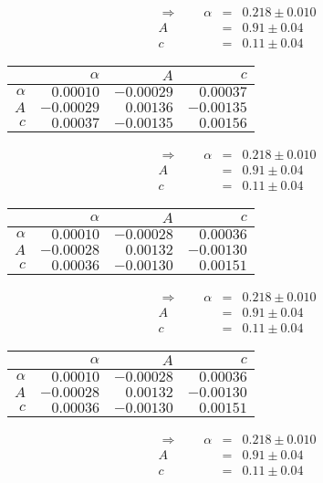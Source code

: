 \begin{align}\Rightarrow \qquad
    \alpha &=& 0.218 \pm 0.010 \\
    A &=& 0.91 \pm 0.04 \\
    c &=& 0.11 \pm 0.04 
\end{align}

 \begin{tabular}{|r|r|r|r|}
 \hline 
\cellcolor{tabcolor}&\cellcolor{tabcolor}$\alpha$&\cellcolor{tabcolor}$A$&\cellcolor{tabcolor}$c$\\ \hline 
 \cellcolor{tabcolor}$\alpha$&$0.00010$ &$-0.00029$ &$0.00037$ \\ \hline
\cellcolor{tabcolor}$A$&$-0.00029$ &$0.00136$ &$-0.00135$ \\ \hline
\cellcolor{tabcolor}$c$&$0.00037$ &$-0.00135$ &$0.00156$ \\ \hline
\end{tabular}
\begin{align}\Rightarrow \qquad
    \alpha &=& 0.218 \pm 0.010 \\
    A &=& 0.91 \pm 0.04 \\
    c &=& 0.11 \pm 0.04 
\end{align}

 \begin{tabular}{|r|r|r|r|}
 \hline 
\cellcolor{tabcolor}&\cellcolor{tabcolor}$\alpha$&\cellcolor{tabcolor}$A$&\cellcolor{tabcolor}$c$\\ \hline 
 \cellcolor{tabcolor}$\alpha$&$0.00010$ &$-0.00028$ &$0.00036$ \\ \hline
\cellcolor{tabcolor}$A$&$-0.00028$ &$0.00132$ &$-0.00130$ \\ \hline
\cellcolor{tabcolor}$c$&$0.00036$ &$-0.00130$ &$0.00151$ \\ \hline
\end{tabular}
\begin{align}\Rightarrow \qquad
    \alpha &=& 0.218 \pm 0.010 \\
    A &=& 0.91 \pm 0.04 \\
    c &=& 0.11 \pm 0.04 
\end{align}

 \begin{tabular}{|r|r|r|r|}
 \hline 
\cellcolor{tabcolor}&\cellcolor{tabcolor}$\alpha$&\cellcolor{tabcolor}$A$&\cellcolor{tabcolor}$c$\\ \hline 
 \cellcolor{tabcolor}$\alpha$&$0.00010$ &$-0.00028$ &$0.00036$ \\ \hline
\cellcolor{tabcolor}$A$&$-0.00028$ &$0.00132$ &$-0.00130$ \\ \hline
\cellcolor{tabcolor}$c$&$0.00036$ &$-0.00130$ &$0.00151$ \\ \hline
\end{tabular}
\begin{align}\Rightarrow \qquad
    \alpha &=& 0.218 \pm 0.010 \\
    A &=& 0.91 \pm 0.04 \\
    c &=& 0.11 \pm 0.04 
\end{align}

